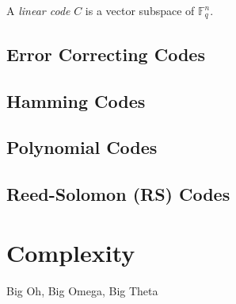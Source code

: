 \documentclass[a4paper, 12pt]{book} %
\begin{document}
\begin{definition}
    A \emph{linear code} $C$ is a vector subspace of $\mathbb{F}_q^n$.
\end{definition}


\section{Error Correcting Codes}
\section{Hamming Codes}
\section{Polynomial Codes}
\section{Reed-Solomon (RS) Codes}


\chapter{Complexity}
Big Oh, Big Omega, Big Theta





















\printindex
\end{document}
